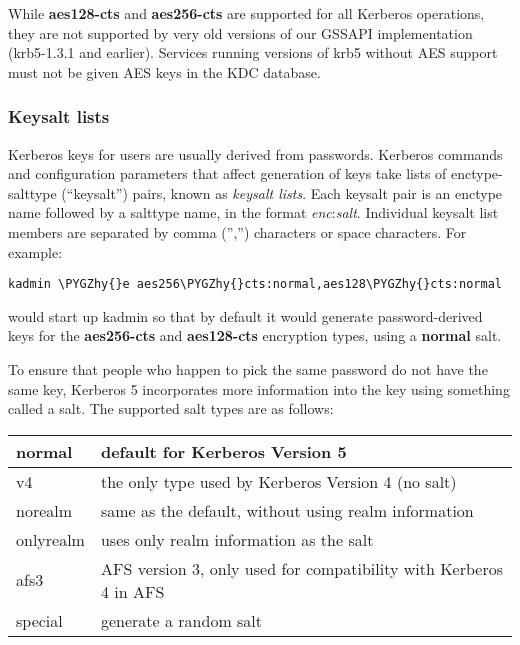 \documentclass[letterpaper,10pt,english]{sphinxmanual}
\def\PYGZhy{\char`\-}
\begin{document}
While \textbf{aes128-cts} and \textbf{aes256-cts} are supported for all Kerberos
operations, they are not supported by very old versions of our GSSAPI
implementation (krb5-1.3.1 and earlier).  Services running versions of
krb5 without AES support must not be given AES keys in the KDC
database.


\subsubsection{Keysalt lists}
\label{admin/conf_files/kdc_conf:id7}\label{admin/conf_files/kdc_conf:keysalt-lists}
Kerberos keys for users are usually derived from passwords.  Kerberos
commands and configuration parameters that affect generation of keys
take lists of enctype-salttype (``keysalt'') pairs, known as \emph{keysalt
lists}.  Each keysalt pair is an enctype name followed by a salttype
name, in the format \emph{enc}:\emph{salt}.  Individual keysalt list members are
separated by comma ('','') characters or space characters.  For example:

\begin{Verbatim}[commandchars=\\\{\}]
kadmin \PYGZhy{}e aes256\PYGZhy{}cts:normal,aes128\PYGZhy{}cts:normal
\end{Verbatim}

would start up kadmin so that by default it would generate
password-derived keys for the \textbf{aes256-cts} and \textbf{aes128-cts}
encryption types, using a \textbf{normal} salt.

To ensure that people who happen to pick the same password do not have
the same key, Kerberos 5 incorporates more information into the key
using something called a salt.  The supported salt types are as
follows:

\begin{tabulary}{\linewidth}{|L|L|}
\hline

normal
 & 
default for Kerberos Version 5
\\
\hline
v4
 & 
the only type used by Kerberos Version 4 (no salt)
\\
\hline
norealm
 & 
same as the default, without using realm information
\\
\hline
onlyrealm
 & 
uses only realm information as the salt
\\
\hline
afs3
 & 
AFS version 3, only used for compatibility with Kerberos 4 in AFS
\\
\hline
special
 & 
generate a random salt
\\
\hline\end{tabulary}
\end{document}
